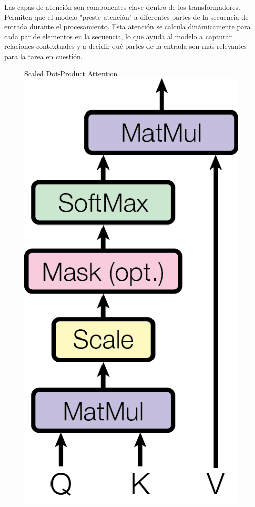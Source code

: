    Las capas de atención son componentes clave dentro de los transformadores. Permiten que el modelo "preste atención" a diferentes partes de la secuencia de entrada durante el procesamiento. Esta atención se calcula dinámicamente para cada par de elementos en la secuencia, lo que ayuda al modelo a capturar relaciones contextuales y a decidir qué partes de la entrada son más relevantes para la tarea en cuestión.
\begin{figure}[H]
\begin{minipage}[f]{0.5\textwidth}
  \centering
  Scaled Dot-Product Attention \\
  \vspace{0.5cm}
  \includegraphics[scale=0.6]{plantilla-libro/ModalNet-19.png}

\end{minipage}
\end{figure}
